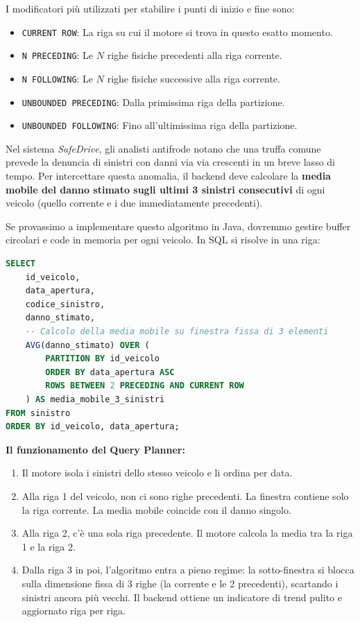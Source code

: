 I modificatori più utilizzati per stabilire i punti di inizio e fine sono:
\begin{itemize}
    \item \texttt{CURRENT ROW}: La riga su cui il motore si trova in questo esatto momento.
    \item \texttt{N PRECEDING}: Le $N$ righe fisiche precedenti alla riga corrente.
    \item \texttt{N FOLLOWING}: Le $N$ righe fisiche successive alla riga corrente.
    \item \texttt{UNBOUNDED PRECEDING}: Dalla primissima riga della partizione.
    \item \texttt{UNBOUNDED FOLLOWING}: Fino all'ultimissima riga della partizione.
\end{itemize}

\begin{example}
Nel sistema \textit{SafeDrive}, gli analisti antifrode notano che una truffa comune prevede la denuncia di sinistri con danni via via crescenti in un breve lasso di tempo. Per intercettare questa anomalia, il backend deve calcolare la \textbf{media mobile del danno stimato sugli ultimi 3 sinistri consecutivi} di ogni veicolo (quello corrente e i due immediatamente precedenti).

Se provassimo a implementare questo algoritmo in Java, dovremmo gestire buffer circolari e code in memoria per ogni veicolo. In SQL si risolve in una riga:

\begin{lstlisting}[language=SQL, basicstyle=\ttfamily\small, keywordstyle=\color{blue}\bfseries]
SELECT 
    id_veicolo,
    data_apertura,
    codice_sinistro,
    danno_stimato,
    -- Calcolo della media mobile su finestra fissa di 3 elementi
    AVG(danno_stimato) OVER (
        PARTITION BY id_veicolo
        ORDER BY data_apertura ASC
        ROWS BETWEEN 2 PRECEDING AND CURRENT ROW
    ) AS media_mobile_3_sinistri
FROM sinistro
ORDER BY id_veicolo, data_apertura;
\end{lstlisting}

\textbf{Il funzionamento del Query Planner:}
\begin{enumerate}
    \item Il motore isola i sinistri dello stesso veicolo e li ordina per data.
    \item Alla riga 1 del veicolo, non ci sono righe precedenti. La finestra contiene solo la riga corrente. La media mobile coincide con il danno singolo.
    \item Alla riga 2, c'è una sola riga precedente. Il motore calcola la media tra la riga 1 e la riga 2.
    \item Dalla riga 3 in poi, l'algoritmo entra a pieno regime: la sotto-finestra si blocca sulla dimensione fissa di 3 righe (la corrente e le 2 precedenti), scartando i sinistri ancora più vecchi. Il backend ottiene un indicatore di trend pulito e aggiornato riga per riga.
\end{enumerate}
\end{example}

